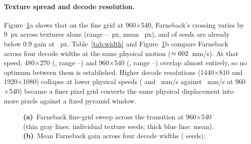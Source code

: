 \documentclass[11pt]{article}
\begin{document}
\begin{table}[t]
\centering\small

\caption{Controlled parameter sweeps at 960$\times$540 under ego-motion (seed counts in column
headers). $d_{0.5}$ is mean half-crossing displacement (px); Shelf is mean regime-one floor gain.}
\label{tab:sweeps}
\end{table}

\paragraph{Texture spread and decode resolution.}
Figure~\ref{fig:fine_width}a shows that on the fine grid at 960$\times$540, Farneback's crossing
varies by 9~px across textures alone (range \cgHalfFineMin{}--\cgHalfFineMax{}~px, mean
\cgHalfFineMean{}~px), and \cgBelowNinety{} of \cgNSeeds{} seeds are already below 0.9 gain at
\cgDispKnee{}~px. Table~\ref{tab:width} and Figure~\ref{fig:fine_width}b compare Farneback across
four decode widths at the same physical motion ($\approx\cgWidthSpeedB{}$~mm/s). At that speed,
480$\times$270 (\cgWidthGainA{}, range \cgWidthGainMinA{}--\cgWidthGainMaxA{}) and 960$\times$540
(\cgWidthGainB{}, range \cgWidthGainMinB{}--\cgWidthGainMaxB{}) overlap almost entirely, so no
optimum between them is established. Higher decode resolutions (1440$\times$810 and
1920$\times$1080) collapse at lower physical speeds (\cgWidthHalfMmSC{} and \cgWidthHalfMmSD{}~mm/s
against \cgWidthHalfMmSB{}~mm/s at 960$\times$540) because a finer pixel grid converts the same
physical displacement into more pixels against a fixed pyramid window.

\begin{figure}[t]
\centering

\caption{\textbf{(a)}~Farneback fine-grid sweep across the transition at 960$\times$540 (thin gray
lines: \cgNSeeds{} individual texture seeds; thick blue line: mean). \textbf{(b)}~Mean Farneback
gain across four decode widths (\cgNSeeds{} seeds).}
\label{fig:fine_width}
\end{figure}

\begin{table}[t]
\centering\small
\resizebox{\linewidth}{!}{}
\caption{Farneback across four decode widths over \cgNSeeds{} texture seeds. Gain is evaluated at
the same physical motion ($\approx\cgWidthSpeedB{}$~mm/s) in every row; crossings are linearly
interpolated on the nine-point grid.}
\label{tab:width}
\end{table}
\end{document}
